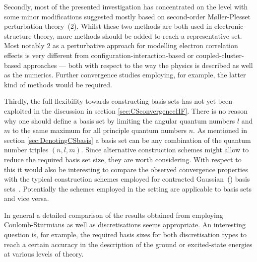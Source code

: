 Secondly, most of the presented investigation has concentrated on the \HF
level with some minor modifications suggested mostly based on
second-order Møller-Plesset perturbation theory~({\MP}2).
Whilst these two methods are both used in electronic structure theory,
more methods should be added to reach a representative set.
Most notably {\MP}2 as a perturbative approach
for modelling electron correlation effects is very different from
configuration-interaction-based
or coupled-cluster-based approaches
--- both with respect to the way the physics is described
as well as the numerics.
Further convergence studies employing, for example, the latter kind of methods
would be required.

Thirdly, the full flexibility towards constructing \CS basis sets has not yet
been exploited in the discussion in section \ref{sec:CSconvergenceHF}.
There is no reason why one should define a basis set
by limiting the angular quantum numbers $l$ and $m$ to the same maximum for all
principle quantum numbers $n$.
As mentioned in section \ref{sec:DenotingCSbasis} a \CS basis set can be any
combination of the quantum number triples $(n, l, m)$.
Since alternative construction schemes might allow to reduce
the required basis set size,
they are worth considering.
With respect to this it would also be interesting to compare the
observed convergence properties with the typical construction schemes
employed for contracted Gaussian~(\cGTO) basis sets~\cite{Jensen2013,Hill2013}.
Potentially the schemes employed in the \cGTO setting are applicable
to \CS basis sets and vice versa.

In general a detailed comparison of the results obtained
from employing Coulomb-Sturmians as well as \cGTO discretisations seems appropriate.
An interesting question is, for example, the required basis sizes for both
discretisation types to reach a certain accuracy
in the description of the ground or excited-state energies
at various levels of theory.

